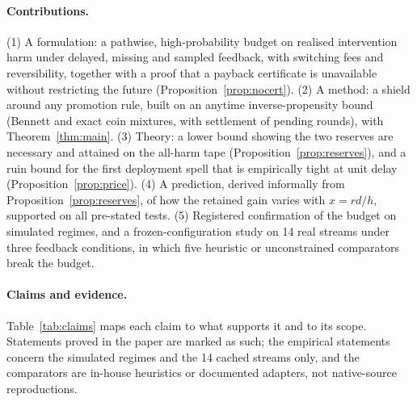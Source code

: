 \documentclass[10pt]{article}
\theoremstyle{plain}
\theoremstyle{definition}
\begin{document}
\paragraph{Contributions.}
(1) A formulation: a pathwise, high-probability budget on realised intervention harm under delayed, missing and sampled feedback, with switching fees and reversibility, together with a proof that a payback certificate is unavailable without restricting the future (Proposition~\ref{prop:nocert}).
(2) A method: a shield around any promotion rule, built on an anytime inverse-propensity bound (Bennett and exact coin mixtures, with settlement of pending rounds), with Theorem~\ref{thm:main}.
(3) Theory: a lower bound showing the two reserves are necessary and attained on the all-harm tape (Proposition~\ref{prop:reserves}), and a ruin bound for the first deployment spell that is empirically tight at unit delay (Proposition~\ref{prop:price}).
(4) A prediction, derived informally from Proposition~\ref{prop:reserves}, of how the retained gain varies with $x=rd/h$, supported on all \RegimeTestsTotal{} pre-stated tests.
(5) Registered confirmation of the budget on \NRegimes{} simulated regimes, and a frozen-configuration study on 14 real streams under three feedback conditions, in which five heuristic or unconstrained comparators break the budget.

\paragraph{Claims and evidence.}
Table~\ref{tab:claims} maps each claim to what supports it and to its scope.
Statements proved in the paper are marked as such; the empirical statements concern the simulated regimes and the 14 cached streams only, and the comparators are in-house heuristics or documented adapters, not native-source reproductions.
\end{document}
